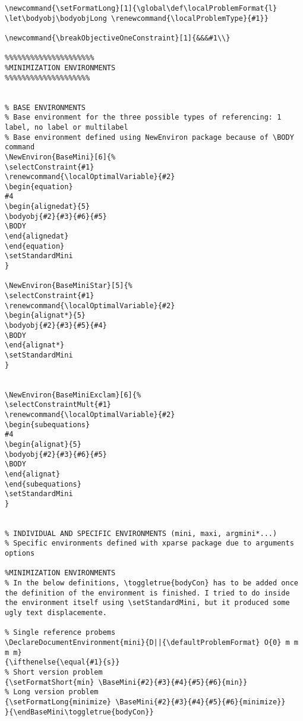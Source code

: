 \documentclass[a4paper]{article}
\begin{document}
\begin{lstlisting}
\newcommand{\setFormatLong}[1]{\global\def\localProblemFormat{l} \let\bodyobj\bodyobjLong \renewcommand{\localProblemType}{#1}}

\newcommand{\breakObjectiveOneConstraint}[1]{&&&#1\\}

%%%%%%%%%%%%%%%%%%%%%
%MINIMIZATION ENVIRONMENTS
%%%%%%%%%%%%%%%%%%%%


% BASE ENVIRONMENTS
% Base environment for the three possible types of referencing: 1 label, no label or multilabel
% Base environment defined using NewEnviron package because of \BODY command
\NewEnviron{BaseMini}[6]{%
\selectConstraint{#1}
\renewcommand{\localOptimalVariable}{#2}
\begin{equation}
#4
\begin{alignedat}{5}
\bodyobj{#2}{#3}{#6}{#5}
\BODY
\end{alignedat}
\end{equation}	
\setStandardMini
}

\NewEnviron{BaseMiniStar}[5]{%
\selectConstraint{#1}
\renewcommand{\localOptimalVariable}{#2}
\begin{alignat*}{5}
\bodyobj{#2}{#3}{#5}{#4}
\BODY
\end{alignat*}
\setStandardMini
}


\NewEnviron{BaseMiniExclam}[6]{%
\selectConstraintMult{#1}
\renewcommand{\localOptimalVariable}{#2}
\begin{subequations}
#4
\begin{alignat}{5}
\bodyobj{#2}{#3}{#6}{#5}
\BODY
\end{alignat}
\end{subequations}
\setStandardMini
}


% INDIVIDUAL AND SPECIFIC ENVIRONMENTS (mini, maxi, argmini*...)
% Specific environments defined with xparse package due to arguments options

%MINIMIZATION ENVIRONMENTS
% In the below definitions, \toggletrue{bodyCon} has to be added once the definition of the environment is finished. I tried to do inside the environment itself using \setStandardMini, but it produced some ugly text displacemente.

% Single reference probems
\DeclareDocumentEnvironment{mini}{D||{\defaultProblemFormat} O{0} m m m m}
{\ifthenelse{\equal{#1}{s}}
% Short version problem
{\setFormatShort{min} \BaseMini{#2}{#3}{#4}{#5}{#6}{min}}
% Long version problem	
{\setFormatLong{minimize} \BaseMini{#2}{#3}{#4}{#5}{#6}{minimize}}
}{\endBaseMini\toggletrue{bodyCon}}


\end{lstlisting}
\end{document}
